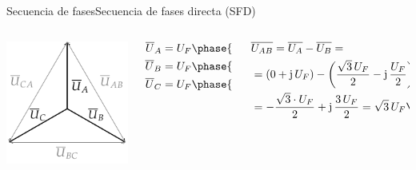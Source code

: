\documentclass[aspectratio=169, xcolor={usenames,svgnames,dvipsnames}]{beamer}
\begin{document}
\begin{frame}{Secuencia de fases}{Secuencia de fases directa (SFD)}
\begin{columns}
\begin{column}{0.25\columnwidth}
\begin{center}
\includegraphics[width=\linewidth]{../figs/FasoresTrifasica_ABC.pdf}
\end{center}
\end{column}
\begin{column}{0.25\columnwidth}
\begin{align*}
  \overline{U}_A &= U_F\phase{{\color{blue}\ang{90}}}\\
  \overline{U}_B &= U_F\phase{\ang{-30}}\\
  \overline{U}_C &= U_F\phase{\ang{-150}}
\end{align*}
\end{column}
\begin{column}{0.5\columnwidth}
	\begin{align*}
		&\overline{U_{AB}}=\overline{U_{A}}-\overline{U_{B}}=\\&=(0+\mathrm{j}\,U_F)-\left(\dfrac{\sqrt{3}\,U_F}{2}-\mathrm{j}\,\dfrac{U_F}{2}\right)=\\
		&=-\dfrac{\sqrt{3}\cdot U_F}{2}+\mathrm{j}\,\dfrac{3\,U_F}{2}=\sqrt{3}\,U_F \phase{ 120^\circ}
	\end{align*}
\end{column}
\end{columns}


\end{frame}
\end{document}
